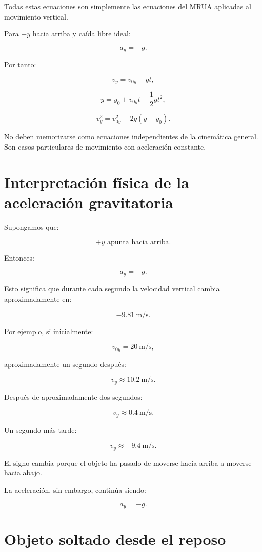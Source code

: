 Todas estas ecuaciones son simplemente las ecuaciones del MRUA aplicadas al movimiento vertical.


\begin{recordatorio}
Para \(+y\) hacia arriba y caída libre ideal:

\[
a_y=-g.
\]

Por tanto:

\[
v_y=v_{0y}-gt,
\]

\[
y=y_0+v_{0y}t-\frac{1}{2}gt^2,
\]

\[
v_y^2=v_{0y}^2-2g(y-y_0).
\]

No deben memorizarse como ecuaciones independientes de la cinemática general. Son casos particulares de movimiento con aceleración constante.
\end{recordatorio}


\section{Interpretación física de la aceleración gravitatoria}

Supongamos que:

\[ +y\text{ apunta hacia arriba}. \]

Entonces:

\[ a_y=-g. \]

Esto significa que durante cada segundo la velocidad vertical cambia aproximadamente en:

\[ -\SI{9.81}{\meter\per\second}. \]

Por ejemplo, si inicialmente:

\[ v_{0y}=\SI{20}{\meter\per\second}, \]

aproximadamente un segundo después:

\[ v_y\approx\SI{10.2}{\meter\per\second}. \]

Después de aproximadamente dos segundos:

\[ v_y\approx\SI{0.4}{\meter\per\second}. \]

Un segundo más tarde:

\[ v_y\approx-\SI{9.4}{\meter\per\second}. \]

El signo cambia porque el objeto ha pasado de moverse hacia arriba a moverse hacia abajo.

La aceleración, sin embargo, continúa siendo:

\[ a_y=-g. \]


\section{Objeto soltado desde el reposo}


